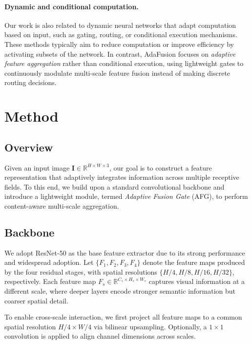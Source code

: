\documentclass[11pt]{article}
\begin{document}
\paragraph{Dynamic and conditional computation.}
Our work is also related to dynamic neural networks that adapt computation based on input,
such as gating, routing, or conditional execution mechanisms. These methods typically aim
to reduce computation or improve efficiency by activating subsets of the network. In
contrast, AdaFusion focuses on \emph{adaptive feature aggregation} rather than conditional
execution, using lightweight gates to continuously modulate multi-scale feature fusion
instead of making discrete routing decisions.

\section{Method}

\subsection{Overview}

Given an input image $\mathbf{I} \in \mathbb{R}^{H \times W \times 3}$,
our goal is to construct a feature representation that adaptively integrates
information across multiple receptive fields. To this end, we build upon a
standard convolutional backbone and introduce a lightweight module, termed
\emph{Adaptive Fusion Gate} (AFG), to perform content-aware multi-scale aggregation.

\subsection{Backbone}

We adopt ResNet-50 as the base feature extractor due to its strong performance
and widespread adoption. Let $\{F_1, F_2, F_3, F_4\}$ denote the feature maps
produced by the four residual stages, with spatial resolutions
$\{H/4, H/8, H/16, H/32\}$, respectively. Each feature map $F_s \in
\mathbb{R}^{C_s \times H_s \times W_s}$ captures visual information at a
different scale, where deeper layers encode stronger semantic information but
coarser spatial detail.

To enable cross-scale interaction, we first project all feature maps to a common
spatial resolution $H/4 \times W/4$ via bilinear upsampling. Optionally, a
$1\times1$ convolution is applied to align channel dimensions across scales.
\end{document}
